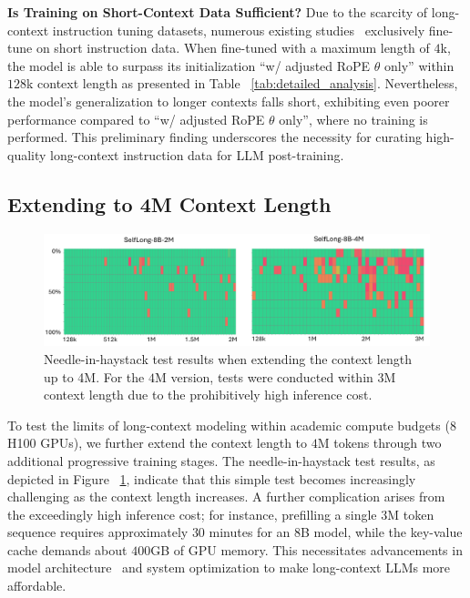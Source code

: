 \documentclass{article}
\begin{document}
\noindent
\textbf{Is Training on Short-Context Data Sufficient?}
Due to the scarcity of long-context instruction tuning datasets,
numerous existing studies~\citep{gao2024train,gradientlongcontextllama3} exclusively fine-tune on short instruction data.
When fine-tuned with a maximum length of $4$k,
the model is able to surpass its initialization ``w/ adjusted RoPE $\theta$ only'' within $128$k context length
as presented in Table ~\ref{tab:detailed_analysis}.
Nevertheless,
the model's generalization to longer contexts falls short,
exhibiting even poorer performance compared to ``w/ adjusted RoPE $\theta$ only'',
where no training is performed.
This preliminary finding underscores the necessity for
curating high-quality long-context instruction data for LLM post-training.

\subsection{Extending to 4M Context Length}

\begin{figure}[ht]
\centering
\includegraphics[width=1.0\textwidth]{4M_needle_results}
\caption{Needle-in-haystack test results when extending the context length up to 4M.
For the $4$M version,
tests were conducted within $3$M context length due to the prohibitively high inference cost.}
\label{fig:4m_needle}
\end{figure}

To test the limits of long-context modeling within academic compute budgets (8 H100 GPUs),
we further extend the context length to $4$M tokens
through two additional progressive training stages.
The needle-in-haystack test results,
as depicted in Figure ~\ref{fig:4m_needle},
indicate that this simple test becomes increasingly challenging as the context length increases.
A further complication arises from the exceedingly high inference cost;
for instance,
prefilling a single $3$M token sequence requires approximately $30$ minutes for an 8B model,
while the key-value cache demands about $400$GB of GPU memory.
This necessitates advancements in model architecture~\citep{sun2024you,ding2023longnet} and system optimization
to make long-context LLMs more affordable.
\end{document}
